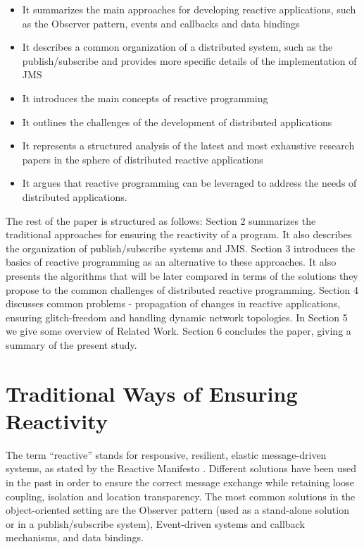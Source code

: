 \documentclass{sigplanconf}
\begin{document}
\begin{itemize} \itemsep1pt \parskip0pt 
  \item It summarizes the main approaches for developing reactive applications, such as the Observer pattern, events and callbacks and data bindings
  \item It describes a common organization of a distributed system, such as the publish/subscribe and provides more specific details of the implementation of JMS
  \item It introduces the main concepts of reactive programming
  \item It outlines the challenges of the development of distributed applications
  \item It represents a structured analysis of the latest and most exhaustive research papers in the sphere of distributed reactive applications
  \item It argues that reactive programming can be leveraged to address the needs of distributed applications.
\end{itemize}

The rest of the paper is structured as follows: Section 2 summarizes the traditional approaches for ensuring the reactivity of a program. It also describes the organization of publish/subscribe systems and JMS. Section 3 introduces the basics of reactive programming as an alternative to these approaches. It also presents the algorithms that will be later compared in terms of the solutions they propose to the common challenges of distributed reactive programming. Section 4 discusses common problems - propagation of changes in reactive applications, ensuring glitch-freedom and handling dynamic network topologies. In Section 5 we give some overview of Related Work. Section 6 concludes the paper, giving a summary of the present study.

\section{Traditional Ways of Ensuring Reactivity}

The term “reactive” stands for responsive, resilient, elastic message-driven systems, as stated by the Reactive Manifesto \cite{rm}. Different solutions have been used in the past in order to ensure the correct message exchange while retaining loose coupling, isolation and location transparency. The most common solutions in the object-oriented setting are the Observer pattern (used as a stand-alone solution or in a publish/subscribe system), Event-driven systems and callback mechanisms, and data bindings.
\end{document}
